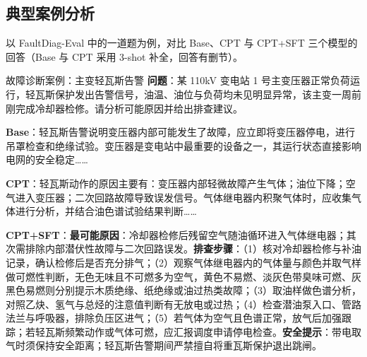\documentclass[fontset=fandol,type=master,campus=shenzhen,etitleauto=true]{hithesisbook}
\begin{document}
\begin{table}[htbp]
\centering
\caption{SFT数据合成管线消融实验结果}
\label{tab:sft-ablation}
\small
{}
\end{table}

\subsection{典型案例分析}\label{subsec:sft-case}

以 FaultDiag-Eval 中的一道题为例，对比 Base、CPT 与 CPT+SFT 三个模型的回答（Base 与 CPT 采用 3-shot 补全，回答有删节）。

\begin{promptbox}{故障诊断案例：主变轻瓦斯告警}
\textbf{问题}：某 110kV 变电站 1 号主变压器正常负荷运行，轻瓦斯保护发出告警信号，油温、油位与负荷均未见明显异常，该主变一周前刚完成冷却器检修。请分析可能原因并给出排查建议。\par\smallskip
\textbf{Base}：轻瓦斯告警说明变压器内部可能发生了故障，应立即将变压器停电，进行吊罩检查和绝缘试验。变压器是变电站中最重要的设备之一，其运行状态直接影响电网的安全稳定……\par\smallskip
\textbf{CPT}：轻瓦斯动作的原因主要有：变压器内部轻微故障产生气体；油位下降；空气进入变压器；二次回路故障导致误发信号。气体继电器内积聚气体时，应收集气体进行分析，并结合油色谱试验结果判断……\par\smallskip
\textbf{CPT+SFT}：\textbf{最可能原因}：冷却器检修后残留空气随油循环进入气体继电器；其次需排除内部潜伏性故障与二次回路误发。\textbf{排查步骤}：（1）核对冷却器检修与补油记录，确认检修后是否充分排气；（2）观察气体继电器内的气体量与颜色并取气样做可燃性判断，无色无味且不可燃多为空气，黄色不易燃、淡灰色带臭味可燃、灰黑色易燃则分别提示木质绝缘、纸绝缘或油过热类故障；（3）取油样做色谱分析，对照乙炔、氢气与总烃的注意值判断有无放电或过热；（4）检查潜油泵入口、管路法兰与呼吸器，排除负压区进气；（5）若气体为空气且色谱正常，放气后加强跟踪；若轻瓦斯频繁动作或气体可燃，应汇报调度申请停电检查。\textbf{安全提示}：带电取气时须保持安全距离；轻瓦斯告警期间严禁擅自将重瓦斯保护退出跳闸。
\end{promptbox}
\end{document}
